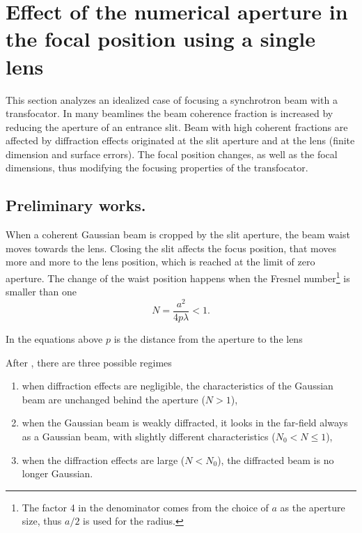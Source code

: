 \documentclass{iucr}              %
\begin{document}

\section{Effect of the numerical aperture in the focal position using a single lens}\label{sec:onelens}

This section analyzes an idealized case of focusing a synchrotron beam with a transfocator. In many beamlines the beam coherence fraction is increased by reducing the aperture of an entrance slit. Beam with high coherent fractions are affected by diffraction effects originated at the slit aperture and at the lens (finite dimension and surface errors). The focal position changes, as well as the focal dimensions, thus modifying the focusing properties of the transfocator. 

\subsection{Preliminary works.}

When a coherent Gaussian beam is cropped by the slit aperture, the beam waist moves towards the lens. Closing the slit affects the focus position, that moves more and more to the lens position, which is reached at the limit of zero aperture. The change of the waist position happens when the Fresnel number\footnote{
The factor 4 in the denominator comes from the choice of $a$ as the aperture size, thus $a/2$ is used for the radius.} is smaller than one
\begin{equation}
    N = \frac{a^2}{4 p \lambda}  < 1.
\end{equation}

In the equations above $p$ is the distance from the aperture to the lens

After , there are three possible regimes 
\begin{enumerate}
\item when diffraction effects are negligible, the
characteristics of the Gaussian beam are unchanged
behind the aperture ($N>1$),
\item when the Gaussian
beam is weakly diffracted, it looks in the far-field always as a Gaussian beam, with slightly different characteristics ($N_0<N \le 1$),
\item when the diffraction effects are large ($N<N_0$),
the diffracted beam is no longer Gaussian.
\end{enumerate}
\end{document}
